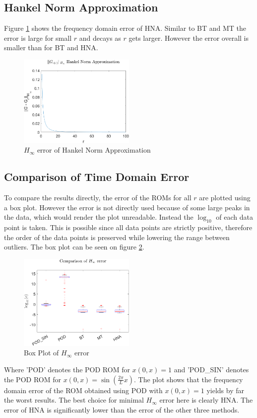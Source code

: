 \subsection{Hankel Norm Approximation}
Figure \ref{FIG-H-HNA} shows the frequency domain error of HNA.
Similar to BT and MT the error is large for small \(r\) and decays as \(r\) gets larger.
However the error overall is smaller than for BT and HNA.
\begin{figure}[H]
\centering
\includegraphics[width=0.5\textwidth]{images/freq/H_HNA}
\caption{$H_{\infty}$ error of Hankel Norm Approximation}
\label{FIG-H-HNA}
\end{figure}

\subsection{Comparison of Time Domain Error}
To compare the results directly, the error of the ROMs for all \(r\) are plotted using a box plot.
However the error is not directly used because of some large peaks in the data, which would render the plot unreadable.
Instead the \(\log_{10}\) of each data point is taken.
This is possible since all data points are strictly positive, therefore the order of the data points is preserved while lowering the range between outliers.
The box plot can be seen on figure \ref{FIG-H-BOX}.
\begin{figure}[H]
\centering
\includegraphics[width=0.5\textwidth]{images/freq/H_BOX}
\caption{Box Plot of $H_{\infty}$ error}
\label{FIG-H-BOX}
\end{figure}
Where 'POD' denotes the POD ROM for \(x(0, x) = 1\) and 'POD\_SIN' denotes the POD ROM for \(x(0, x) =  \sin(\frac{2\pi}{L}x)\).
The plot shows that the frequency domain error of the ROM obtained using POD with \(x(0, x) = 1\) yields by far the worst results.
The best choice for minimal \(H_{\infty}\) error here is clearly HNA. 
The error of HNA is significantly lower than the error of the other three methods.

